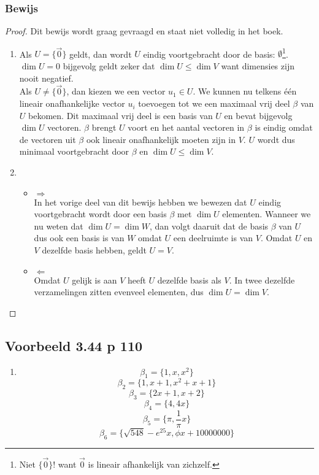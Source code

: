 \documentclass[lineaire_algebra_oplossingen.tex]{subfiles}
\begin{document}
\subsubsection*{Bewijs}
\begin{proof}
Dit bewijs wordt graag gevraagd en staat niet volledig in het boek.
\begin{enumerate}
\item
Als $U=\{\vec{0}\}$ geldt, dan wordt $U$ eindig voortgebracht door de basis: $\emptyset$\footnote{Niet $\{\vec{0}\}$! want $\vec{0}$ is lineair afhankelijk van zichzelf.}. $\dim U = 0$ bijgevolg geldt zeker dat $\dim U\le \dim V$ want dimensies zijn nooit negatief.\\
Als $U \neq \{\vec{0}\}$, dan kiezen we een vector $u_1 \in U$. We kunnen nu telkens \'e\'en lineair onafhankelijke vector $u_i$ toevoegen tot we een maximaal vrij deel $\beta$ van $U$ bekomen. Dit maximaal vrij deel is een basis van $U$ en bevat bijgevolg $\dim U$ vectoren. $\beta$ brengt $U$ voort en het aantal vectoren in $\beta$ is eindig omdat de vectoren uit $\beta$ ook lineair onafhankelijk moeten zijn in $V$. $U$ wordt dus minimaal voortgebracht door $\beta$ en $\dim U \le \dim V$.
\item
\begin{itemize}
\item $\Rightarrow$\\
In het vorige deel van dit bewijs hebben we bewezen dat $U$ eindig voortgebracht wordt door een basis $\beta$ met $\dim U$ elementen. Wanneer we nu weten dat $\dim U=\dim W$, dan volgt daaruit dat de basis $\beta$ van $U$ dus ook een basis is van $W$ omdat $U$ een deelruimte is van $V$. Omdat $U$ en $V$ dezelfde basis hebben, geldt $U = V$.
\item $\Leftarrow$\\
Omdat $U$ gelijk is aan $V$ heeft $U$ dezelfde basis als $V$. In twee dezelfde verzamelingen zitten evenveel elementen, dus $\dim U=\dim V$.
\end{itemize}
\end{enumerate}
\end{proof}


\subsection{Voorbeeld 3.44 p 110} %
\label{3.44}
\begin{enumerate}
\item
\[
\beta_1 = \{1,x,x^2\}
\]
\[
\beta_2 = \{1,x+1,x^2+x+1\}
\]
\[
\beta_3 = \{2x+1,x+2\}
\]
\[
\beta_4 = \{4,4x\}
\]
\[
\beta_5 = \{\pi,\frac{1}{\pi}x\}
\]
\[
\beta_6 = \{\sqrt{548}-e^{25}x,\phi x + 10000000\}
\]
\end{enumerate}
\end{document}
